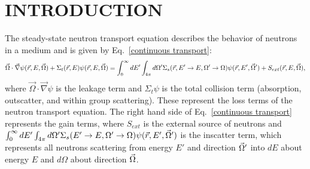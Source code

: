 %
%
%
%



\pagestyle{plain} %
\setcounter{page}{1}


\chapter{\uppercase {Introduction}}

The steady-state neutron transport equation describes the behavior of neutrons in a medium and is given by Eq.~\eqref{continuous transport}:
\begin{equation}
\vec{\Omega} \cdot \vec \nabla \psi(\vec{r},E,\vec{\Omega}) +\Sigma_t(\vec{r},E) \psi(\vec{r},E,\vec{\Omega})  =
\int_{0}^{\infty}dE' \int_{4\pi}d\Omega' \Sigma_s(\vec{r},E'\to E, \Omega'\to\Omega)\psi(\vec{r},E',\vec{\Omega}')
+ S_{ext}(\vec{r},E,\vec{\Omega}) ,
\label{continuous transport}
\end{equation}
where $\vec{\Omega}\cdot \vec\nabla\psi$ is the leakage term and $\Sigma_t\psi$ is the total collision term (absorption, outscatter, and within group scattering). These represent the loss terms of the neutron transport equation. The right hand side of Eq.~\eqref{continuous transport} represents the gain terms, where $S_{ext}$ is the external source of neutrons and $\int_{0}^{\infty}dE'\int_{4\pi}d\Omega'\Sigma_s(E'\to E, \Omega'\to\Omega)\psi(\vec{r},E',\vec{\Omega}')$ is the inscatter term, which represents all neutrons scattering from energy $E'$ and direction $\vec{\Omega}'$ into $dE$ about energy $E$ and $d\Omega$ about direction $\vec{\Omega}$.

